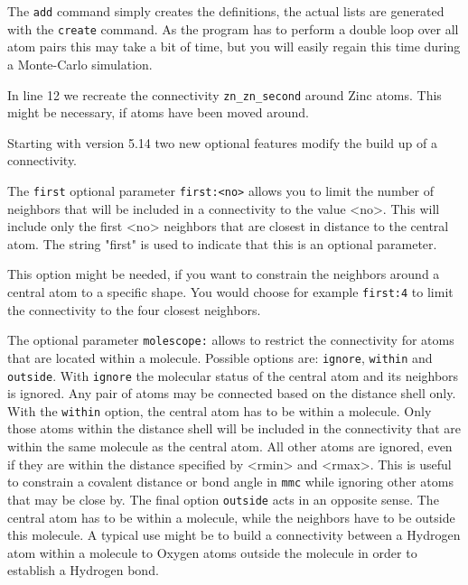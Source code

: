 The {\tt add} command simply creates the definitions, the actual 
lists are generated with the {\tt create} command. As the program 
has to perform a double loop over all atom pairs this may take a bit 
of time, but you will easily regain this time during a Monte-Carlo 
simulation.

In line 12 we recreate the connectivity {\tt zn\_zn\_second} around
Zinc atoms. This might be necessary, if atoms have been moved around.

Starting with version 5.14 two new optional features modify the 
build up of a connectivity.

The {\tt first} optional parameter {\tt first:<no>} allows you to limit
the number of neighbors that will be included in a connectivity to
the value <no>. This will include only the first <no> neighbors
that are closest in distance to the central atom. 
The string "first" is used to indicate that this 
is an optional parameter. 

This option might be needed, if you want to constrain the neighbors
around a central atom to a specific shape. You would choose for 
example {\tt first:4} to limit the connectivity to the four closest 
neighbors.

The optional parameter {\tt molescope:} allows to restrict the 
connectivity for atoms that are located within a molecule. 
Possible options are: {\tt ignore}, {\tt within} and {\tt outside}.
With {\tt ignore} the molecular status of the central atom and its 
neighbors is ignored. Any pair of atoms may be connected based on the
distance shell only. With the {\tt within} option, the central atom 
has to be within a molecule. Only those atoms within the distance shell
will be included in the connectivity that are within the same molecule
as the central atom. All other atoms are ignored, even if they are 
within the distance specified by <rmin> and <rmax>. This is useful
to constrain a covalent distance or bond angle in {\tt mmc}
while ignoring other atoms that may be close by.
The final option {\tt outside} acts in an opposite sense. The central 
atom has to be within a molecule, while the neighbors have to be 
outside this molecule. A typical use might be to build a connectivity
between a Hydrogen atom within a molecule to Oxygen atoms outside 
the molecule in order to establish a Hydrogen bond.

